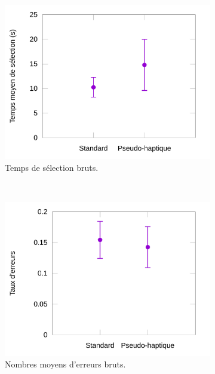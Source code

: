 	\begin{figure}[htbp]
		\begin{subfigure}[t]{0.49\textwidth}
			\centering
			\includegraphics[width=\textwidth]{figures/ch5/phSpRawTimes}
			\caption{Temps de sélection bruts.}
			\label{fig:phSpRawTimes}
		\end{subfigure}
		~
		\begin{subfigure}[t]{0.49\textwidth}
			\centering
			\includegraphics[width=\textwidth]{figures/ch5/phSpRawErrors}
			\caption{Nombres moyens d'erreurs bruts.}
			\label{fig:phSpRawErrors}
		\end{subfigure}
		~
		\begin{subfigure}[t]{0.49\textwidth}
			\centering

\end{subfigure}
\end{figure}

